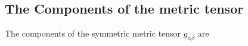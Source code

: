 \documentclass[pdflatex,sn-mathphys-num]{sn-jnl}%
\theoremstyle{thmstyleone}%
\theoremstyle{thmstyletwo}%
\theoremstyle{thmstylethree}%
\begin{document}
\begin{appendices}
\subsection{The Components of the metric tensor}\label{appendix:metric_tensor_off_diagonal}

The components of the symmetric metric tensor $g_{\alpha\beta}$ are



\end{appendices}
\end{document}
